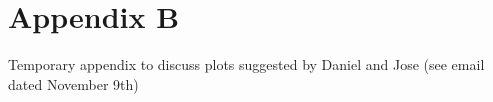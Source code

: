
\chapter{Appendix B}
\label{app:app0b}

Temporary appendix to discuss plots suggested by Daniel and Jose (see email dated November 9th)




